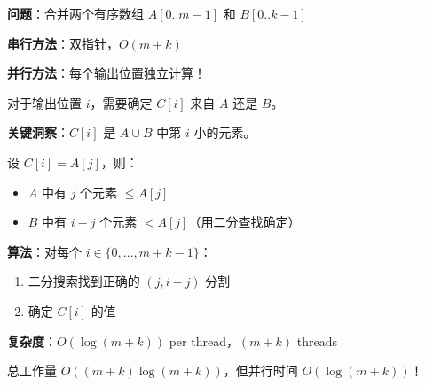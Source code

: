 \documentclass[12pt, a4paper]{ctexart}
\begin{document}
\begin{blackboard}

\textbf{问题}：合并两个有序数组 $A[0..m-1]$ 和 $B[0..k-1]$

\textbf{串行方法}：双指针，$O(m+k)$

\textbf{并行方法}：每个输出位置独立计算！

对于输出位置 $i$，需要确定 $C[i]$ 来自 $A$ 还是 $B$。

\textbf{关键洞察}：$C[i]$ 是 $A \cup B$ 中第 $i$ 小的元素。

设 $C[i] = A[j]$，则：
\begin{itemize}
    \item $A$ 中有 $j$ 个元素 $\leq A[j]$
    \item $B$ 中有 $i - j$ 个元素 $< A[j]$（用二分查找确定）
\end{itemize}

\textbf{算法}：对每个 $i \in \{0, \ldots, m+k-1\}$：
\begin{enumerate}
    \item 二分搜索找到正确的 $(j, i-j)$ 分割
    \item 确定 $C[i]$ 的值
\end{enumerate}

\textbf{复杂度}：$O(\log(m+k))$ per thread，$(m+k)$ threads

总工作量 $O((m+k)\log(m+k))$，但并行时间 $O(\log(m+k))$！

\end{blackboard}
\end{document}
